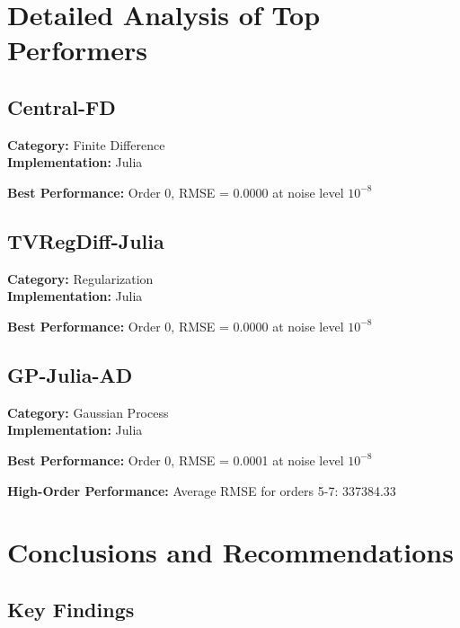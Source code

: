 \documentclass[11pt]{article}
\begin{document}
\section{Detailed Analysis of Top Performers}

\subsection{Central-FD}

\textbf{Category:} Finite Difference \\
\textbf{Implementation:} Julia

\textbf{Best Performance:} Order 0, RMSE = 0.0000 at noise level $10^{-8}$


\subsection{TVRegDiff-Julia}

\textbf{Category:} Regularization \\
\textbf{Implementation:} Julia

\textbf{Best Performance:} Order 0, RMSE = 0.0000 at noise level $10^{-8}$


\subsection{GP-Julia-AD}

\textbf{Category:} Gaussian Process \\
\textbf{Implementation:} Julia

\textbf{Best Performance:} Order 0, RMSE = 0.0001 at noise level $10^{-8}$

\textbf{High-Order Performance:} Average RMSE for orders 5-7: 337384.33


\section{Conclusions and Recommendations}

\subsection{Key Findings}
\end{document}
